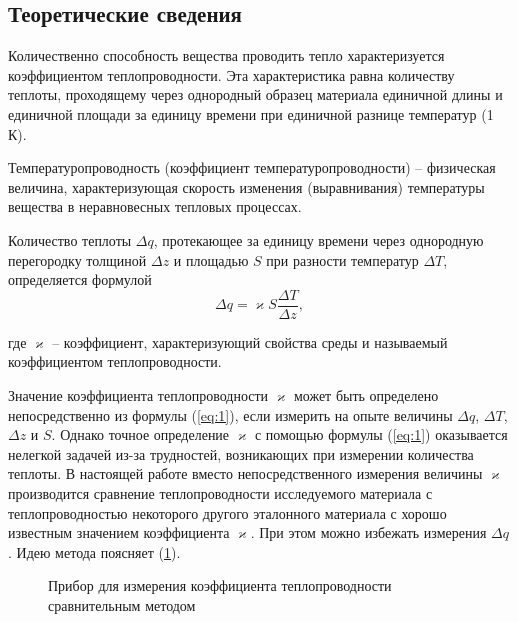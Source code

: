 \documentclass[a4paper,11.5pt]{article} %
\begin{document}
\subsection{Теоретические сведения}

Количественно способность вещества проводить тепло характеризуется коэффициентом теплопроводности. Эта характеристика равна количеству теплоты, проходящему через однородный образец материала единичной длины и единичной площади за единицу времени при единичной разнице температур (1 К).

Температуропроводность (коэффициент температуропроводности) -- физическая величина, характеризующая скорость изменения (выравнивания) температуры вещества в неравновесных тепловых процессах. 

Количество теплоты $\Delta q$, протекающее за единицу времени через однородную перегородку толщиной $\Delta z$ и площадью $S$ при разности температур $\Delta T$, определяется формулой
\begin{equation}
	\Delta q =  \varkappa S \frac{\Delta T}{\Delta z},
	\label{eq:1}
\end{equation}

где $\varkappa$ -- коэффициент, характеризующий свойства среды и называемый коэффициентом теплопроводности.

Значение коэффициента теплопроводности $\varkappa$ может быть определено непосредственно из формулы (\ref{eq:1}), если измерить на опыте величины $\Delta q$, $\Delta T$, $\Delta z$ и $S$. Однако точное определение $\varkappa$ с помощью формулы (\ref{eq:1}) оказывается нелегкой задачей из-за трудностей, возникающих при измерении количества теплоты. В настоящей работе вместо непосредственного измерения величины $\varkappa$ производится сравнение теплопроводности исследуемого материала с теплопроводностью некоторого другого эталонного материала с хорошо известным значением коэффициента $\varkappa$. При этом можно избежать измерения $\Delta q$. Идею метода поясняет (\ref{pic:1}).

\begin{figure}[h]
	\caption{Прибор для измерения коэффициента теплопроводности
сравнительным методом}
	\label{pic:1}
\end{figure}
\end{document}
